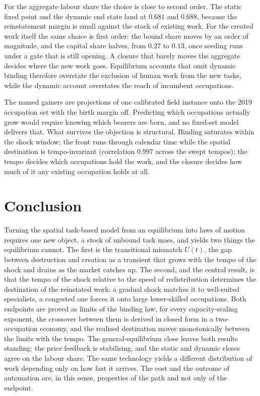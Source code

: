 \documentclass[12pt, a4paper]{article}
\begin{document}
For the aggregate labour share the choice is close to second order.
The static fixed point and the dynamic end state land at $0.681$ and
$0.688$, because the reinstatement margin is small against the stock
of existing work. For the created work itself the same choice is first
order: the bound share moves by an order of magnitude, and the capital
share halves, from $0.27$ to $0.13$, once seeding runs under a gate
that is still opening. A closure that barely moves the aggregate
decides where the new work goes. Equilibrium accounts that omit
dynamic binding therefore overstate the exclusion of human work from
the new tasks, while the dynamic account overstates the reach of
incumbent occupations.

The named gainers are projections of one calibrated field instance
onto the 2019 occupation set with the birth margin off. Predicting
which occupations actually grow would require knowing which bearers
are born, and no fixed-set model delivers that. What survives the
objection is structural. Binding saturates within the shock window;
the front runs through calendar time while the spatial destination is
tempo-invariant (correlation $0.997$ across the swept tempos); the
tempo decides which occupations hold the work, and the closure decides
how much of it any existing occupation holds at all.

\section{Conclusion}
\label{sec:conclusion}

Turning the spatial task-based model from an equilibrium into laws of
motion requires one new object, a stock of unbound task mass, and yields
two things the equilibrium cannot. The first is the transitional
mismatch $U(t)$, the gap between destruction and creation as a transient
that grows with the tempo of the shock and drains as the market catches
up. The second, and the central result, is that the tempo of the shock
relative to the speed of redistribution determines the destination of the
reinstated work: a gradual shock matches it to well-suited specialists,
a congested one forces it onto large lower-skilled occupations. Both
endpoints are proved as limits of the binding law, for every
capacity-scaling exponent, the crossover between them is derived in
closed form in a two-occupation economy, and the realised destination
moves monotonically between the limits with the tempo. The
general-equilibrium close leaves both results standing: the price
feedback is stabilising, and the static and dynamic closes agree on the
labour share. The same technology yields a different
distribution of work depending only on how fast it arrives. The cost
and the outcome of automation are, in this sense, properties of the
path and not only of the endpoint.
\end{document}

